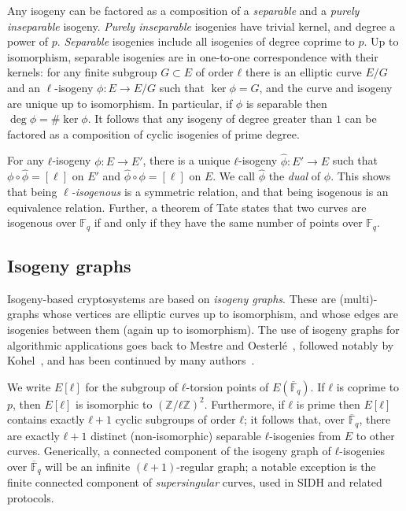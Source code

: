 \documentclass{llncs}
\newcommand{\F}{\mathbb{F}}
\newcommand{\Fbar}{\overline{\mathbb{F}}}
\begin{document}
Any isogeny can be factored as a composition of a \emph{separable} and
a \emph{purely inseparable} isogeny. \emph{Purely inseparable}
isogenies have trivial kernel, and degree a power of $p$.
\emph{Separable} isogenies include all
isogenies of degree coprime to $p$.
Up to isomorphism, separable isogenies
are in one-to-one correspondence with their kernels:
for any finite subgroup $G⊂E$ of order $ℓ$ there is 
an elliptic curve $E/G$ and an $\ell$-isogeny $\phi: E \to E/G$
such that $\ker \phi = G$,
and the curve and isogeny are unique up to isomorphism.
In particular, if $\phi$ is separable then $\deg ϕ=\#\ker ϕ$.
It follows
that any isogeny of degree greater than $1$ can be factored as a
composition of cyclic isogenies of prime degree.

For any $ℓ$-isogeny $ϕ:E→E'$, there is a unique $ℓ$-isogeny
$\hat{ϕ}:E'→E$ such that $ϕ∘\hat{ϕ} = [\ell]$ on $E'$
and $\hat{ϕ}∘ϕ = [\ell]$ on $E$.
We call $\hat{ϕ}$ the \emph{dual} of $ϕ$. This
shows that being \emph{$\ell$-isogenous} is a symmetric
relation, and that being isogenous is an equivalence relation.
 Further, a theorem of Tate states that two curves are
isogenous over $\F_q$ if and only if they have the same number of
points over $\F_q$.


\subsection{Isogeny graphs}
\label{sec:isogeny-graphs}

Isogeny-based cryptosystems are based on \emph{isogeny graphs}.
These are
(multi)-graphs whose vertices are
elliptic curves up to isomorphism, and whose edges are isogenies
between them (again up to isomorphism).
The use of isogeny graphs for algorithmic applications 
goes back to Mestre and Oesterlé~\cite{Mestre},
followed notably by Kohel~\cite{kohel},
and has been continued by many
authors~\cite{Gal,fouquet+morain02,GHS,MiretMSTV06,jao+miller+venkatesan09}.

We write $E[ℓ]$ for the subgroup of $ℓ$-torsion points of
$E(\Fbar_q)$.  If $ℓ$ is coprime to $p$, then $E[ℓ]$ is isomorphic to
$(ℤ/ℓℤ)^2$.  Furthermore, if $ℓ$ is prime then $E[ℓ]$ contains exactly
$ℓ+1$ cyclic subgroups of order $ℓ$; it follows that, over $\Fbar_q$,
there are exactly $ℓ+1$ distinct (non-isomorphic) separable $ℓ$-isogenies 
from $E$ to other curves.
Generically, a connected component of the isogeny graph of
$ℓ$-isogenies over $\Fbar_q$ will be an infinite $(ℓ+1)$-regular
graph; a notable exception is the finite connected component of
\emph{supersingular} curves, used in SIDH and related protocols.
\end{document}
